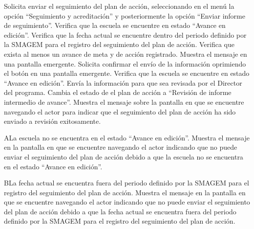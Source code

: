   \begin{UCtrayectoria}
    \UCpaso[\UCactor] Solicita enviar el seguimiento del plan de acción, seleccionando en el menú  la opción ``Seguimiento y acreditación'' y posteriormente la opción ``Enviar informe de seguimiento''. 
	\UCpaso[\UCsist] Verifica que la escuela se encuentre en  estado ``Avance en edición''. 
    \UCpaso[\UCsist] Verifica que la fecha actual se encuentre dentro del periodo definido por la SMAGEM para el registro del seguimiento del plan de acción. 
    \UCpaso[\UCsist] Verifica que exista al menos un avance de meta y de acción registrado. 
    \UCpaso[\UCsist] Muestra el mensaje  en una pantalla emergente.
    \UCpaso[\UCactor] Solicita confirmar el envío de la información oprimiendo el botón  en una pantalla emergente.  
	\UCpaso[\UCsist] Verifica que la escuela se encuentre en  estado ``Avance en edición''. 
    \UCpaso[\UCsist] Envía la información para que sea revisada por el Director del programa.
    \UCpaso[\UCsist] Cambia el estado de el plan de acción a ``Revisión de informe intermedio de avance''.
    \UCpaso[\UCsist] Muestra el mensaje  sobre la pantalla en que se encuentre navegando el actor para indicar que el seguimiento del plan de acción ha sido enviado a revisión exitosamente.
 \end{UCtrayectoria}
 
\begin{UCtrayectoriaA}{A}{La escuela no se encuentra en el estado ``Avance en edición''.}
    \UCpaso[\UCsist] Muestra el mensaje  en la pantalla en que se encuentre navegando el actor indicando que no puede enviar el seguimiento del plan de acción debido a que la escuela no se encuentra en el estado ``Avance en edición''. 
 \end{UCtrayectoriaA}
 
   \begin{UCtrayectoriaA}{B}{La fecha actual se encuentra fuera del periodo definido por la SMAGEM para el registro del seguimiento del plan de acción.}
    \UCpaso[\UCsist] Muestra el mensaje  en la pantalla en que se encuentre navegando el actor indicando que no puede enviar el seguimiento del plan de acción debido a que la fecha actual se encuentra fuera del periodo definido por la SMAGEM para el registro del seguimiento del plan de acción.
 \end{UCtrayectoriaA}
 
